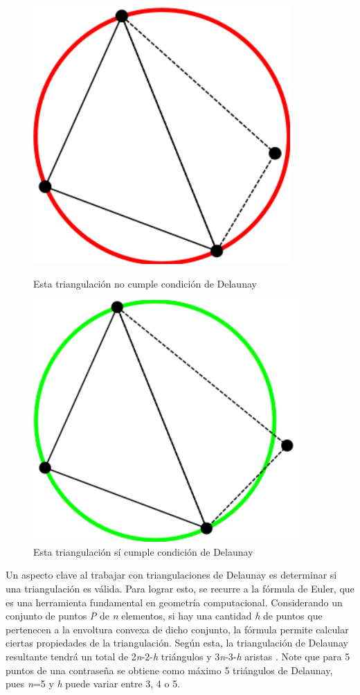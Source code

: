 \documentclass[12pt]{report}
\begin{document}
	
	\begin{figure}[h]
		\centering
		\begin{minipage}{0.45\textwidth}
			\centering
			\includegraphics[width=0.44\linewidth]{no_td.png}  %
			\caption{Esta triangulación no cumple condición de Delaunay}
			\label{no_cumple}
			
		\end{minipage}\hfill
		\begin{minipage}{0.45\textwidth}
			\centering
			\includegraphics[width=0.5\linewidth]{si_td.png}  %
			\caption{Esta triangulación sí cumple condición de Delaunay}
			\label{cumple}
		\end{minipage}
	\end{figure}

	
	Un aspecto clave al trabajar con triangulaciones de Delaunay es determinar si una triangulación es válida. Para lograr esto, se recurre a la fórmula de Euler, que es una herramienta fundamental en geometría computacional. Considerando un conjunto de puntos \textit{P} de \textit{n} elementos, si hay una cantidad \textit{h} de puntos que pertenecen a la envoltura convexa de dicho conjunto, la fórmula permite calcular ciertas propiedades de la triangulación. Según esta, la triangulación de Delaunay resultante tendrá un total de 2\textit{n}-2-\textit{h} triángulos y 3\textit{n}-3-\textit{h} aristas \cite{29}. Note que para  5 puntos de una contraseña se obtiene como máximo 5 triángulos de Delaunay, pues \textit{n}=5 y \textit{h} puede variar entre 3, 4 o 5.
	
\end{document}
